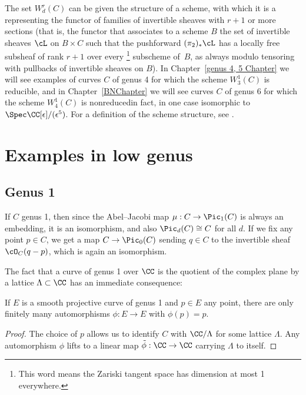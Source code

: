 The set $W^r_d(C)$ can be given the structure of a scheme, with which
it is a 
%
representing the functor of families of
invertible sheaves with $r+1$ or more sections (that is, the functor
that associates to a scheme $B$ the set of invertible sheaves $\cL$ on
$B \times C$ such that the pushforward $(\pi_2)_*\cL$ has a locally
free subsheaf of rank $r+1$ over every 
%
%
\footnote{This word means the Zariski tangent space has dimension at most 1 everywhere.}
subscheme of~$B$,
as always modulo tensoring with pullbacks of invertible sheaves on $B$). 
In Chapter~\ref{genus 4, 5 Chapter} we will see examples of
curves $C$ of genus 4 for which the scheme $W^1_3(C)$ is reducible,
and in Chapter~\ref{BNChapter} we will see curves $C$ of genus 6 for
which the scheme $W^1_4(C)$ is nonreduced\emdash in fact, in one case
isomorphic to $\Spec \CC[\epsilon]/(\epsilon^5)$. For a definition of
the scheme structure, see \cite[Section IV.3]{ACGH}.

\section{Examples in low genus}

\subsection*{Genus 1} 

If $C$ 
genus 1, then since the Abel--Jacobi map $\mu : C \to \Pic_1(C)$ is
always an embedding, it is an isomorphism, and also $\Pic_d(C) \cong
C$ for all $d$. If we fix any point $p \in C$, we get a map $C \to
\Pic_0(C)$ sending $q \in C$ to the invertible sheaf $\cO_C(q-p)$,
which is again an isomorphism.

The fact that a curve of genus 1 over $\CC$ is the quotient of the complex plane by a lattice $\Lambda \subset \CC$ has an immediate consequence:

\begin{corollary}\label{finite automorphism genus 1}
If $E$ is a smooth projective curve of genus 1 and $p \in E$ any point, there are only finitely many automorphisms $\phi : E \to E$ with $\phi(p) = p$.
\unif
\end{corollary}

\begin{proof} The choice of $p$ allows us to identify $C$ with $\CC/\Lambda$ for some lattice $\Lambda$.
Any automorphism $\phi$ lifts to a linear map $\tilde \phi : \CC \to \CC$ carrying $\Lambda$ to itself.
\end{proof} 


